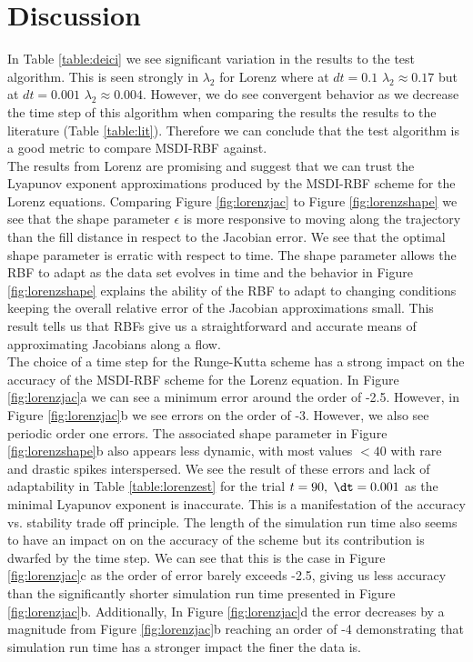 \chapter{Discussion}

    In Table \ref{table:deici} we see significant variation in the results to the test algorithm. This is seen strongly
    in $\lambda_2$ for Lorenz where at $dt=0.1$ $\lambda_2\approx 0.17$ but at $dt=0.001$ $\lambda_2\approx 0.004$. However,
    we do see convergent behavior as we decrease the time step of this algorithm when comparing the results the results
    to the literature (Table \ref{table:lit}). Therefore we can conclude that the test algorithm is a good metric to compare
    MSDI-RBF against.\\

            The results from Lorenz are promising and suggest that we can trust the Lyapunov exponent
            approximations produced by the MSDI-RBF scheme for the Lorenz equations. Comparing Figure \ref{fig:lorenzjac} to Figure \ref{fig:lorenzshape} we see that the shape parameter $\epsilon$ is more responsive to moving along
            the trajectory than the fill distance in respect to the Jacobian error. We see that the optimal shape parameter
            is erratic with respect to time. The shape parameter allows the RBF to adapt as the data set evolves in
            time and the behavior in Figure \ref{fig:lorenzshape} explains the ability of the RBF to adapt to changing conditions keeping the overall relative error
            of the Jacobian approximations small. This result tells us that RBFs give us
            a straightforward and accurate means of approximating Jacobians along a flow.\\

            The choice of a time step for the Runge-Kutta scheme has a strong impact on the accuracy of the MSDI-RBF scheme
            for the Lorenz equation. In Figure \ref{fig:lorenzjac}a we can see a minimum error around the order of -2.5.
            However, in Figure \ref{fig:lorenzjac}b we see errors on the order of -3. However, we also see periodic order one errors. The associated
            shape parameter in Figure \ref{fig:lorenzshape}b also appears less dynamic, with most values $<40$ with rare and drastic spikes
            interspersed. We see the result of these errors and lack of adaptability in Table \ref{table:lorenzest} for
            the trial $t=90, \ \dt=0.001$ as the minimal Lyapunov exponent is inaccurate. This is a manifestation of the
            accuracy vs. stability trade off principle. The length of the simulation run time also
            seems to have an impact on on the accuracy of the scheme but its contribution is dwarfed by the time step. We can
            see that this is the case in Figure \ref{fig:lorenzjac}c as the order of error barely exceeds -2.5, giving us
            less accuracy than the significantly shorter simulation run time presented in Figure \ref{fig:lorenzjac}b. Additionally,
            In Figure \ref{fig:lorenzjac}d the error decreases by a magnitude from Figure \ref{fig:lorenzjac}b reaching an order of
            -4 demonstrating that simulation run time has a stronger impact the finer the data is.\\

